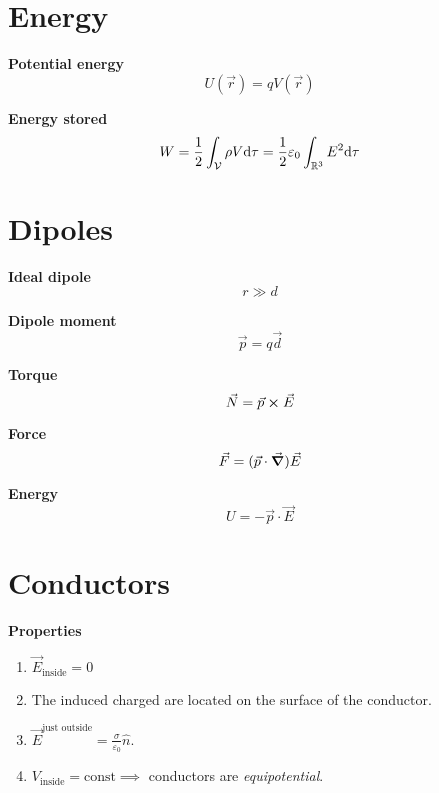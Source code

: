 \documentclass[10pt]{extarticle}
\numberwithin{equation}{section}
\begin{document}
\begin{multicols}{2}
    \section{Energy}

    \textbf{Potential energy}
    \begin{equation}
        U(\vec r) = q V(\vec r)
    \end{equation}

    \textbf{Energy stored}
    \begin{equation}
        W = \frac{1}{2} \int_{\mathcal V} \rho V \dd \tau = \frac{1}{2} \varepsilon_0 \int_{\mathbb{R}^3} E^2 \dd \tau
    \end{equation}

    \section{Dipoles}

    \textbf{Ideal dipole}
    \begin{equation}
        r \gg d
    \end{equation}

    \textbf{Dipole moment}
    \begin{equation}
        \vec p = q \vec d
    \end{equation}

    \textbf{Torque}
    \begin{equation}
        \vec N = \vec p \cross \vec E
    \end{equation}

    \textbf{Force}
    \begin{equation}
        \vec F = (\vec p \cdot \grad) \vec E
    \end{equation}

    \textbf{Energy}
    \begin{equation}
        U = - \vec p \cdot \vec E
    \end{equation}

    \section{Conductors}

    \textbf{Properties}
    \begin{enumerate}
        \item $\vec E_\text{inside} = 0$
        \item The induced charged are located on the surface of the conductor.
        \item $\vec E^\text{just outside} = \frac{\sigma}{\varepsilon_0} \hat n$.
        \item $V_\text{inside} = \text{const} \implies$ conductors are \emph{equipotential}.
    \end{enumerate}


\end{multicols}
\end{document}
